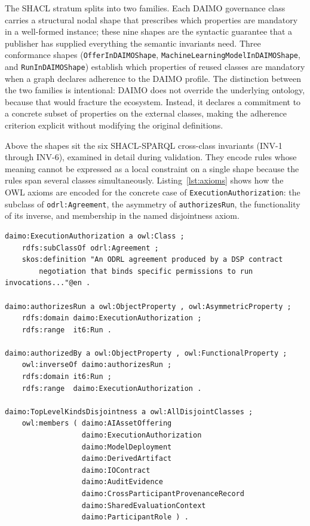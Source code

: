 \documentclass[Afour,sagev,times]{sagej}
\newcommand{\code}[1]{\texttt{#1}}
\begin{document}
The SHACL stratum splits into two families. Each DAIMO governance class carries a structural nodal shape that prescribes which properties are mandatory in a well-formed instance; these nine shapes are the syntactic guarantee that a publisher has supplied everything the semantic invariants need. Three conformance shapes (\code{OfferInDAIMOShape}, \code{MachineLearningModelInDAIMOShape}, and \code{RunInDAIMOShape}) establish which properties of reused classes are mandatory when a graph declares adherence to the DAIMO profile. The distinction between the two families is intentional: DAIMO does not override the underlying ontology, because that would fracture the ecosystem. Instead, it declares a commitment to a concrete subset of properties on the external classes, making the adherence criterion explicit without modifying the original definitions.

Above the shapes sit the six SHACL-SPARQL cross-class invariants (INV-1 through INV-6), examined in detail during validation. They encode rules whose meaning cannot be expressed as a local constraint on a single shape because the rules span several classes simultaneously. Listing~\ref{lst:axioms} shows how the OWL axioms are encoded for the concrete case of \code{ExecutionAuthorization}: the subclass of \code{odrl:Agreement}, the asymmetry of \code{authorizesRun}, the functionality of its inverse, and membership in the named disjointness axiom.

\begin{lstlisting}[label=lst:axioms,caption={Core axioms around \code{ExecutionAuthorization}.}]
daimo:ExecutionAuthorization a owl:Class ;
    rdfs:subClassOf odrl:Agreement ;
    skos:definition "An ODRL agreement produced by a DSP contract
        negotiation that binds specific permissions to run invocations..."@en .

daimo:authorizesRun a owl:ObjectProperty , owl:AsymmetricProperty ;
    rdfs:domain daimo:ExecutionAuthorization ;
    rdfs:range  it6:Run .

daimo:authorizedBy a owl:ObjectProperty , owl:FunctionalProperty ;
    owl:inverseOf daimo:authorizesRun ;
    rdfs:domain it6:Run ;
    rdfs:range  daimo:ExecutionAuthorization .

daimo:TopLevelKindsDisjointness a owl:AllDisjointClasses ;
    owl:members ( daimo:AIAssetOffering
                  daimo:ExecutionAuthorization
                  daimo:ModelDeployment
                  daimo:DerivedArtifact
                  daimo:IOContract
                  daimo:AuditEvidence
                  daimo:CrossParticipantProvenanceRecord
                  daimo:SharedEvaluationContext
                  daimo:ParticipantRole ) .
\end{lstlisting}
\end{document}

